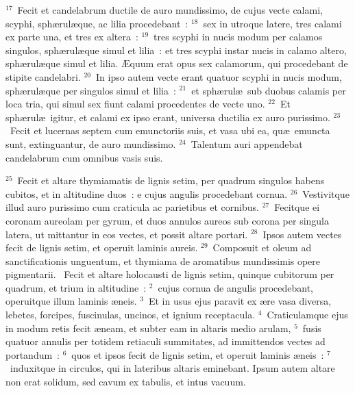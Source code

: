 ${}^{17}$~Fecit et candelabrum ductile de auro mundissimo, de cujus vecte calami, scyphi, sph\ae rul\ae que, ac lilia procedebant~:
${}^{18}$~sex in utroque latere, tres calami ex parte una, et tres ex altera~:
${}^{19}$~tres scyphi in nucis modum per calamos singulos, sph\ae rul\ae que simul et lilia~: et tres scyphi instar nucis in calamo altero, sph\ae rul\ae que simul et lilia. \AE quum erat opus sex calamorum, qui procedebant de stipite candelabri.
${}^{20}$~In ipso autem vecte erant quatuor scyphi in nucis modum, sph\ae rul\ae que per singulos simul et lilia~:
${}^{21}$~et sph\ae rul\ae\ sub duobus calamis per loca tria, qui simul sex fiunt calami procedentes de vecte uno.
${}^{22}$~Et sph\ae rul\ae\ igitur, et calami ex ipso erant, universa ductilia ex auro purissimo.
${}^{23}$~Fecit et lucernas septem cum emunctoriis suis, et vasa ubi ea, qu\ae\ emuncta sunt, extinguantur, de auro mundissimo.
${}^{24}$~Talentum auri appendebat candelabrum cum omnibus vasis suis.


${}^{25}$~Fecit et altare thymiamatis de lignis setim, per quadrum singulos habens cubitos, et in altitudine duos~: e cujus angulis procedebant cornua.
${}^{26}$~Vestivitque illud auro purissimo cum craticula ac parietibus et cornibus.
${}^{27}$~Fecitque ei coronam aureolam per gyrum, et duos annulos aureos sub corona per singula latera, ut mittantur in eos vectes, et possit altare portari.
${}^{28}$~Ipsos autem vectes fecit de lignis setim, et operuit laminis aureis.
${}^{29}$~Composuit et oleum ad sanctificationis unguentum, et thymiama de aromatibus mundissimis opere pigmentarii.
~Fecit et altare holocausti de lignis setim, quinque cubitorum per quadrum, et trium in altitudine~:
${}^{2}$~cujus cornua de angulis procedebant, operuitque illum laminis \ae neis.
${}^{3}$~Et in usus ejus paravit ex \ae re vasa diversa, lebetes, forcipes, fuscinulas, uncinos, et ignium receptacula.
${}^{4}$~Craticulamque ejus in modum retis fecit \ae neam, et subter eam in altaris medio arulam,
${}^{5}$~fusis quatuor annulis per totidem retiaculi summitates, ad immittendos vectes ad portandum~:
${}^{6}$~quos et ipsos fecit de lignis setim, et operuit laminis \ae neis~:
${}^{7}$~induxitque in circulos, qui in lateribus altaris eminebant. Ipsum autem altare non erat solidum, sed cavum ex tabulis, et intus vacuum.


